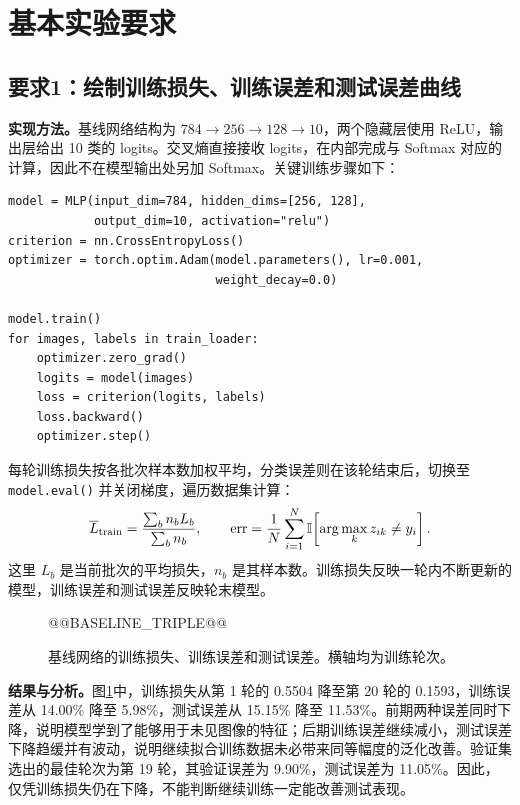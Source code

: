 \documentclass[UTF8,11pt,a4paper,fontset=fandol]{ctexart}
\newcommand{\err}{\operatorname{err}}
\newcommand{\question}[1]{\Needspace{14\baselineskip}\subsection{#1}}
\begin{document}
\clearpage
\section{基本实验要求}
\question{要求1：绘制训练损失、训练误差和测试误差曲线}
\textbf{实现方法。}基线网络结构为 $784\to256\to128\to10$，两个隐藏层使用 ReLU，输出层给出 10 类的 logits。交叉熵直接接收 logits，在内部完成与 Softmax 对应的计算，因此不在模型输出处另加 Softmax。关键训练步骤如下：
\par\noindent\begin{minipage}{\linewidth}
\begin{lstlisting}
model = MLP(input_dim=784, hidden_dims=[256, 128],
            output_dim=10, activation="relu")
criterion = nn.CrossEntropyLoss()
optimizer = torch.optim.Adam(model.parameters(), lr=0.001,
                             weight_decay=0.0)

model.train()
for images, labels in train_loader:
    optimizer.zero_grad()
    logits = model(images)
    loss = criterion(logits, labels)
    loss.backward()
    optimizer.step()
\end{lstlisting}
\end{minipage}\par
每轮训练损失按各批次样本数加权平均，分类误差则在该轮结束后，切换至 \texttt{model.eval()} 并关闭梯度，遍历数据集计算：
\begin{equation}
\overline{L}_{\rm train}=\frac{\sum_b n_b L_b}{\sum_b n_b},\qquad
\err=\frac{1}{N}\sum_{i=1}^{N}\mathbb{I}\!\left[\arg\max_k z_{ik}\ne y_i\right].
\end{equation}
这里 $L_b$ 是当前批次的平均损失，$n_b$ 是其样本数。训练损失反映一轮内不断更新的模型，训练误差和测试误差反映轮末模型。
\begin{figure}[H]\centering
@@BASELINE_TRIPLE@@
\caption{基线网络的训练损失、训练误差和测试误差。横轴均为训练轮次。}\label{fig:baseline}
\end{figure}
\textbf{结果与分析。}图\ref{fig:baseline}中，训练损失从第 1 轮的 0.5504 降至第 20 轮的 0.1593，训练误差从 14.00\% 降至 5.98\%，测试误差从 15.15\% 降至 11.53\%。前期两种误差同时下降，说明模型学到了能够用于未见图像的特征；后期训练误差继续减小，测试误差下降趋缓并有波动，说明继续拟合训练数据未必带来同等幅度的泛化改善。验证集选出的最佳轮次为第 19 轮，其验证误差为 9.90\%，测试误差为 11.05\%。因此，仅凭训练损失仍在下降，不能判断继续训练一定能改善测试表现。
\end{document}

